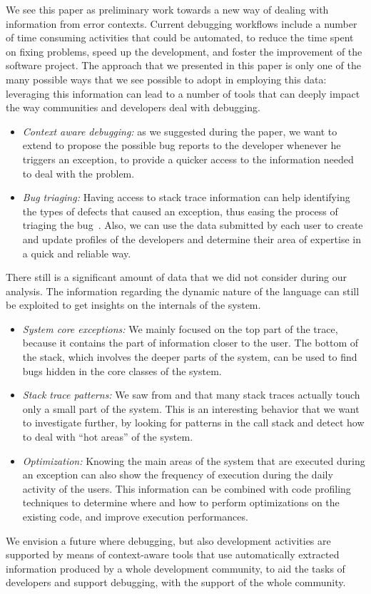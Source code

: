 We see this paper as preliminary work towards a new way of dealing with information from error contexts.
Current debugging workflows include a number of time consuming activities that could be automated, to reduce the time spent on fixing problems, speed up the development, and foster the improvement of the software project.
The approach that we presented in this paper is only one of the many possible ways that we see possible to adopt in employing this data: leveraging this information can lead to a number of tools that can deeply impact the way communities and developers deal with debugging.
\begin{itemize}%
\item\textit{Context aware debugging:} as we suggested during the paper, we want to extend \shr to propose the possible bug reports to the developer whenever he triggers an exception, to provide a quicker access to the information needed to deal with the problem.

\item\textit{Bug triaging:} Having access to stack trace information can help identifying the types of defects that caused an exception, thus easing the process of triaging the bug~\cite{Anvik2006a}.
Also, we can use the data submitted by each user to create and update profiles of the developers and determine their area of expertise in a quick and reliable way.

\end{itemize}

There still is a significant amount of data that we did not consider during our analysis.
The information regarding the dynamic nature of the language can still be exploited to get insights on the internals of the system.

\begin{itemize}%

\item\textit{System core exceptions:} We mainly focused on the top part of the trace, because it contains the part of information closer to the user.
The bottom of the stack, which involves the deeper parts of the system, can be used to find bugs hidden in the core classes of the system.

\item\textit{Stack trace patterns:} We saw from  and  that many stack traces actually touch only a small part of the system.
This is an interesting behavior that we want to investigate further, by looking for patterns in the call stack and detect how to deal with ``hot areas'' of the system.

\item\textit{Optimization:} Knowing the main areas of the system that are executed during an exception can also show the frequency of execution during the daily activity of the users.
This information can be combined with code profiling techniques to determine where and how to perform optimizations on the existing code, and improve execution performances.
\end{itemize}

We envision a future where debugging, but also development activities are supported by means of context-aware tools that use automatically extracted information produced by a whole development community, to aid the tasks of developers and support debugging, with the support of the whole community.
